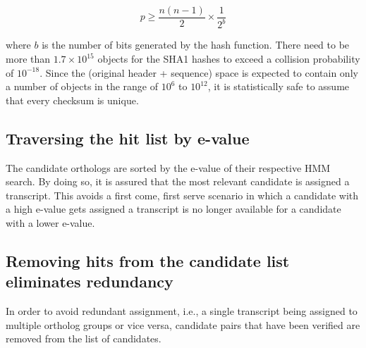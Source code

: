 \begin{equation}
p \ge \frac{n (n-1)}{2} \times \frac{1}{2^b}
\label{eq:hashcollision}
\end{equation}

where $b$ is the number of bits generated by the hash function. There need to be
more than $1.7 \times 10^{15}$ objects for the SHA1 hashes to exceed a collision
probability of $10^{-18}$. Since the (original header + sequence) space is
expected to contain only a number of objects in the range of $10^6$ to
$10^{12}$, it is statistically safe to assume that every checksum is unique. 

\subsection{Traversing the hit list by e-value}

The candidate orthologs are sorted by the e-value of their respective HMM
search. By doing so, it is assured that the most relevant candidate is assigned
a transcript. This avoids a first come, first serve scenario in which a
candidate with a high e-value gets assigned a transcript is no longer available
for a candidate with a lower e-value.

\subsection{Removing hits from the candidate list eliminates redundancy}

In order to avoid redundant assignment, i.e., a single transcript being assigned
to multiple ortholog groups or vice versa, candidate pairs that have been
verified are removed from the list of candidates. 
